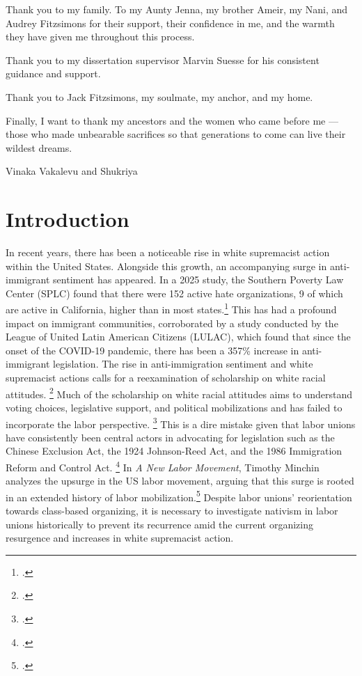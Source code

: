\documentclass[12pt,a4paper]{article}
\begin{document}
\bigskip

\noindent Thank you to my family. To my Aunty Jenna, my brother Ameir, my Nani, and Audrey Fitzsimons for their support, their confidence in me, and the warmth they have given me throughout this process.

\bigskip

\noindent Thank you to my dissertation supervisor Marvin Suesse for his consistent guidance and support. 

\bigskip

\noindent Thank you to Jack Fitzsimons, my soulmate, my anchor, and my home.

\bigskip

\noindent Finally, I want to thank my ancestors and the women who came before me — those who made unbearable sacrifices so that generations to come can live their wildest dreams.

\bigskip

\noindent Vinaka Vakalevu and Shukriya

\newpage
\tableofcontents
\newpage


\section*{Introduction}

In recent years, there has been a noticeable rise in white supremacist action within the United States. Alongside this growth, an accompanying surge in anti-immigrant sentiment has appeared. In a 2025 study, the Southern Poverty Law Center (SPLC) found that there were 152 active hate organizations, 9 of which are active in California, higher than in most states.\footcite{the_southern_poverty_law_center_white_2025} This has had a profound impact on immigrant communities, corroborated by a study conducted by the League of United Latin American Citizens (LULAC), which found that since the onset of the COVID-19 pandemic, there has been a 357\% increase in anti-immigrant legislation. The rise in anti-immigration sentiment and white supremacist actions calls for a reexamination of scholarship on white racial attitudes. \footcite{andrade_new_2025} Much of the scholarship on white racial attitudes aims to understand voting choices, legislative support, and political mobilizations and has failed to incorporate the labor perspective. \footcite{frymer_labor_2020} This is a dire mistake given that labor unions have consistently been central actors in advocating for legislation such as the Chinese Exclusion Act, the 1924 Johnson-Reed Act, and the 1986 Immigration Reform and Control Act. \footcite{frymer_labor_2020}  In \textit{A New Labor Movement}, Timothy Minchin analyzes the upsurge in the US labor movement, arguing that this surge is rooted in an extended history of labor mobilization.\footcite{minchin_new_2024} Despite labor unions' reorientation towards class-based organizing, it is necessary to investigate nativism in labor unions historically to prevent its recurrence amid the current organizing resurgence and increases in white supremacist action. 
\end{document}
